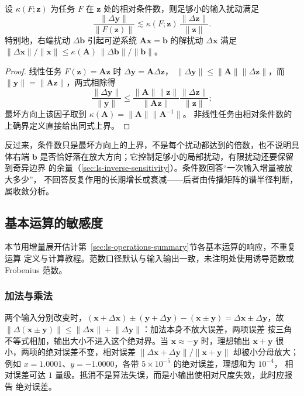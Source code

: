 \begin{theorem}[条件数基本界]
\label{thm:matrix-analysis-condition-number-bound}
设 $\kappa(F;\bm z)$ 为任务 $F$ 在 $\bm z$ 处的相对条件数，则足够小的输入扰动满足
\begin{equation}
 \frac{\lVert\Delta\bm y\rVert}{\lVert F(\bm z)\rVert}
 \lesssim\kappa(F;\bm z)\,\frac{\lVert\Delta\bm z\rVert}{\lVert\bm z\rVert}.
 \label{eq:matrix-analysis-condition-number-bound}
\end{equation}
特别地，右端扰动 $\Delta\bm b$ 引起可逆系统 $\bm A\bm x=\bm b$ 的解扰动
$\Delta\bm x$ 满足
$\lVert\Delta\bm x\rVert/\lVert\bm x\rVert\leq\kappa(\bm A)\,
\lVert\Delta\bm b\rVert/\lVert\bm b\rVert$。
\end{theorem}
\begin{proof}
线性任务 $F(\bm z)=\bm A\bm z$ 时 $\Delta\bm y=\bm A\Delta\bm z$，
$\lVert\Delta\bm y\rVert\leq\lVert\bm A\rVert\lVert\Delta\bm z\rVert$，而
$\lVert\bm y\rVert=\lVert\bm A\bm z\rVert$，两式相除得
\[
 \frac{\lVert\Delta\bm y\rVert}{\lVert\bm y\rVert}
 \leq\frac{\lVert\bm A\rVert\lVert\bm z\rVert}{\lVert\bm A\bm z\rVert}
 \frac{\lVert\Delta\bm z\rVert}{\lVert\bm z\rVert};
\]
最坏方向上该因子取到 $\kappa(\bm A)=\lVert\bm A\rVert\lVert\bm A^{-1}\rVert$。
非线性任务由相对条件数的上确界定义直接给出同式上界。
\end{proof}

反过来，条件数只是最坏方向上的上界，不是每个扰动都达到的倍数，也不说明具体右端
$\bm b$ 是否恰好落在放大方向；它控制足够小的局部扰动，有限扰动还要保留到奇异边界
的余量（\ref{sec:ls-inverse-sensitivity}）。条件数回答“一次输入增量被放大多少”，
不回答反复作用的长期增长或衰减——后者由传播矩阵的谱半径判断，属收敛分析。

\subsection{基本运算的敏感度}
\label{sec:ls-basic-operations-sensitivity}

本节用增量展开估计第~\ref{sec:ls-operations-summary}节各基本运算的响应，不重复运算
定义与计算教程。范数口径默认与输入输出一致，未注明处使用诱导范数或 Frobenius 范数。

\subsubsection{加法与乘法}

两个输入分别改变时，$(\bm x+\Delta\bm x)\pm(\bm y+\Delta\bm y)-(\bm x\pm\bm y)
=\Delta\bm x\pm\Delta\bm y$，故 $\lVert\Delta(\bm x\pm\bm y)\rVert
\leq\lVert\Delta\bm x\rVert+\lVert\Delta\bm y\rVert$：加法本身不放大误差，两项误差
按三角不等式相加，输出大小不进入这个绝对界。当 $\bm x\approx-\bm y$ 时，理想输出
$\bm x+\bm y$ 很小，两项的绝对误差不变，相对误差
$\lVert\Delta\bm x+\Delta\bm y\rVert/\lVert\bm x+\bm y\rVert$ 却被小分母放大；例如
$x=1.0001$、$y=-1.0000$，各带 $5\times10^{-5}$ 的绝对误差，理想和为 $10^{-4}$，
相对误差可达 $1$ 量级。抵消不是算法失误，而是小输出使相对尺度失效，此时应报告
绝对误差。

